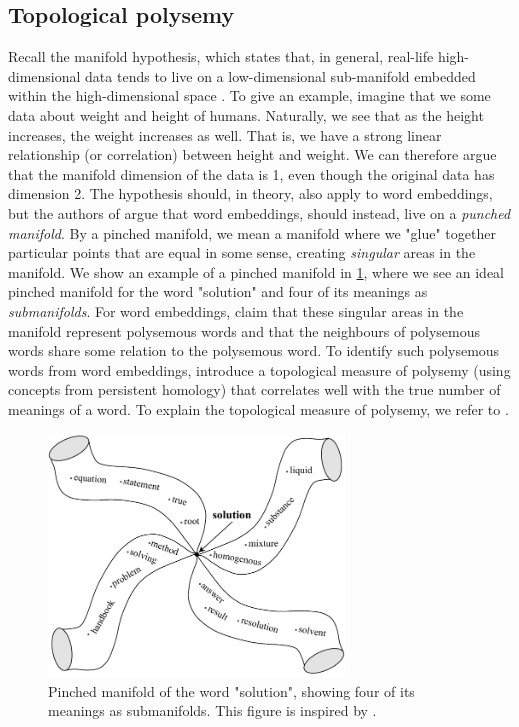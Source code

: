 \subsection{Topological polysemy}
\label{sec:topological-polysemy}
Recall the manifold hypothesis, which states that, in general, real-life high-dimensional data tends to live on a low-dimensional sub-manifold embedded within the high-dimensional space \cite[p. 16]{bengio2014representation}. To give an example, imagine that we some data about weight and height of humans. Naturally, we see that as the height increases, the weight increases as well. That is, we have a strong linear relationship (or correlation) between height and weight. We can therefore argue that the manifold dimension of the data is 1, even though the original data has dimension 2. The hypothesis should, in theory, also apply to word embeddings, but the authors of \cite{jakubowski2020topology} argue that word embeddings, should instead, live on a \textit{punched manifold}. By a pinched manifold, we mean a manifold where we "glue" together particular points that are equal in some sense, creating \textit{singular} areas in the manifold. We show an example of a pinched manifold in \cref{fig:pinched-manifold}, where we see an ideal pinched manifold for the word "solution" and four of its meanings as \textit{submanifolds}. For word embeddings, \cite{jakubowski2020topology} claim that these singular areas in the manifold represent polysemous words and that the neighbours of polysemous words share some relation to the polysemous word. To identify such polysemous words from word embeddings, \cite{jakubowski2020topology} introduce a topological measure of polysemy (using concepts from persistent homology) that correlates well with the true number of meanings of a word. To explain the topological measure of polysemy, we refer to \cite{jakubowski2020topology}.
\begin{figure}[H]
    \centering
    \includegraphics[width=0.7\textwidth]{thesis/figures/pinched-manifold_cropped.pdf}
    \caption{Pinched manifold of the word "solution", showing four of its meanings as submanifolds. This figure is inspired by \cite[Figure 5]{jakubowski2020topology}.}
    \label{fig:pinched-manifold}
\end{figure}

